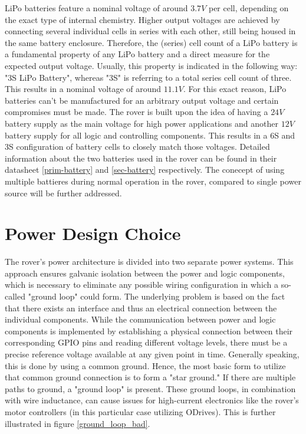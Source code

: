    \vspace{5mm} %
    
    LiPo batteries feature a nominal voltage of around $3.7V$ per cell, depending on the exact type of internal chemistry. Higher output voltages are achieved by connecting several individual cells in series with each other, still being housed in the same battery enclosure. Therefore, the (series) cell count of a LiPo battery is a fundamental property of any LiPo battery and a direct measure for the expected output voltage. Usually, this property is indicated in the following way: "3S LiPo Battery", whereas "3S" is referring to a total series cell count of three. This results in a nominal voltage of around $11.1V$. For this exact reason, LiPo batteries can't be manufactured for an arbitrary output voltage and certain compromises must be made. The rover is built upon the idea of having a $24V$ battery supply as the main voltage for high power applications and another $12V$ battery supply for all logic and controlling components. This results in a 6S and 3S configuration of battery cells to closely match those voltages. Detailed information about the two batteries used in the rover can be found in their datasheet \ref{prim-battery} and \ref{sec-battery} respectively. The conecept of using multiple battieres during normal operation in the rover, compared to single power source will be further addressed.

    \clearpage %
    
\section{Power Design Choice}

    The rover's power architecture is divided into two separate power systems. This approach ensures galvanic isolation between the power and logic components, which is necessary to eliminate any possible wiring configuration in which a so-called "ground loop" could form. The underlying problem is based on the fact that there exists an interface and thus an electrical connection between the individual components. While the communication between power and logic components is implemented by establishing a physical connection between their corresponding GPIO pins and reading different voltage levels, there must be a precise reference voltage available at any given point in time. Generally speaking, this is done by using a common ground. Hence, the most basic form to utilize that common ground connection is to form a "star ground." If there are multiple paths to ground, a "ground loop" is present. These ground loops, in combination with wire inductance, can cause issues for high-current electronics like the rover's motor controllers (in this particular case utilizing ODrives). This is further illustrated in figure \ref{ground_loop_bad}.
    
